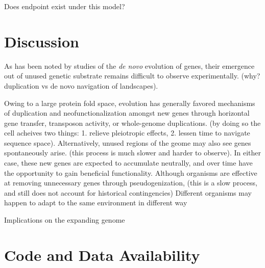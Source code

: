 \documentclass[paper=a4, fontsize=11pt,twoside]{scrartcl}       %
\begin{document}
Does endpoint exist under this model?

\section*{Discussion}

As has been noted by studies of the \textit{de novo} evolution of genes, their emergence out of unused genetic substrate remains difficult to observe experimentally. (why? duplication vs de novo navigation of landscapes).

Owing to a large protein fold space, evolution has generally favored mechanisms of duplication and neofunctionalization amongst new genes through horizontal gene transfer, transposon activity, or whole-genome duplications. (by doing so the cell acheives two things: 1. relieve pleiotropic effects, 2. lessen time to navigate sequence space). Alternatively, unused regions of the geome may also see genes spontaneously arise. (this process is much slower and harder to observe). In either case, these new genes are expected to accumulate neutrally, and over time have the opportunity to gain beneficial functionality.
Although organisms are effective at removing unnecessary genes through pseudogenization, (this is a slow process, and still does not account for historical contingencies)
Different organisms may happen to adapt to the same environment in different way

Implications on the expanding genome

\section*{Code and Data Availability}

\printbibliography
\end{document}
